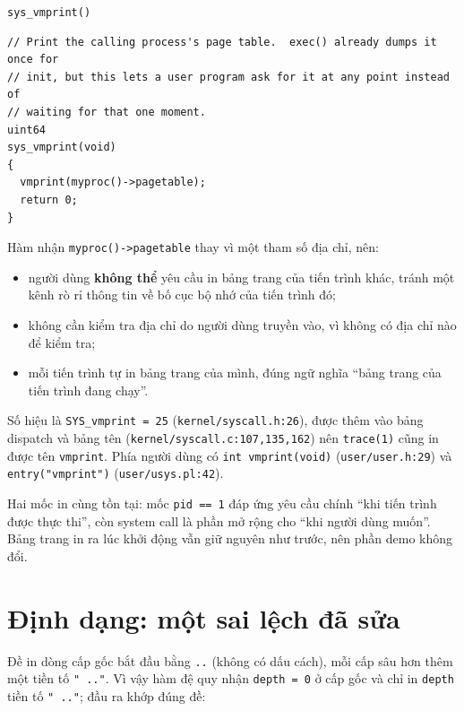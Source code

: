 \begin{codebox}[sysVmprint]{\texttt{sys\_vmprint()}}
    \begin{verbatim}
// Print the calling process's page table.  exec() already dumps it once for
// init, but this lets a user program ask for it at any point instead of
// waiting for that one moment.
uint64
sys_vmprint(void)
{
  vmprint(myproc()->pagetable);
  return 0;
}
    \end{verbatim}
\end{codebox}

Hàm nhận \texttt{myproc()->pagetable} thay vì một tham số địa chỉ, nên:

\begin{itemize}[itemsep=0pt, topsep=2.5pt, leftmargin=1.5cm]
    \item người dùng \textbf{không thể} yêu cầu in bảng trang của tiến trình khác, tránh một kênh rò rỉ thông tin về bố cục bộ nhớ của tiến trình đó;
    \item không cần kiểm tra địa chỉ do người dùng truyền vào, vì không có địa chỉ nào để kiểm tra;
    \item mỗi tiến trình tự in bảng trang của mình, đúng ngữ nghĩa ``bảng trang của tiến trình đang chạy''.
\end{itemize}

Số hiệu là \texttt{SYS\_vmprint = 25} (\texttt{kernel/syscall.h:26}), được thêm vào bảng dispatch và bảng tên (\texttt{kernel/syscall.c:107,135,162}) nên \texttt{trace(1)} cũng in được tên \texttt{vmprint}. Phía người dùng có \texttt{int vmprint(void)} (\texttt{user/user.h:29}) và \texttt{entry("vmprint")} (\texttt{user/usys.pl:42}).

Hai mốc in cùng tồn tại: mốc \texttt{pid == 1} đáp ứng yêu cầu chính ``khi tiến trình được thực thi'', còn system call là phần mở rộng cho ``khi người dùng muốn''. Bảng trang in ra lúc khởi động vẫn giữ nguyên như trước, nên phần demo không đổi.

\section{Định dạng: một sai lệch đã sửa}

Đề in dòng cấp gốc bắt đầu bằng \texttt{..} (không có dấu cách), mỗi cấp sâu hơn thêm một tiền tố \texttt{" .."}. Vì vậy hàm đệ quy nhận \texttt{depth = 0} ở cấp gốc và chỉ in \texttt{depth} tiền tố \texttt{" .."}; đầu ra khớp đúng đề:

